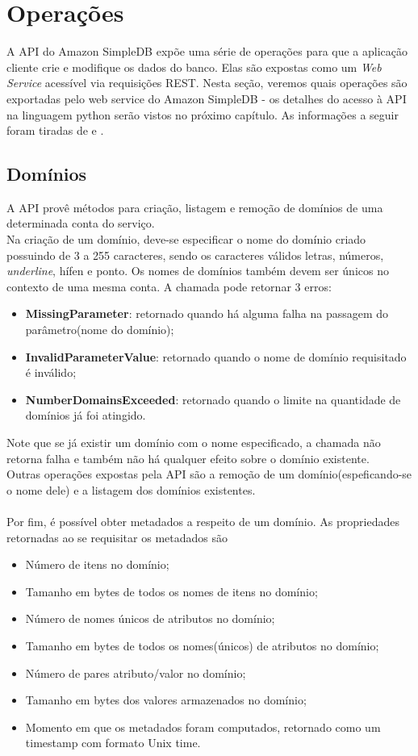 \section{Operações}
A API do Amazon SimpleDB expõe uma série de operações para que a aplicação cliente crie e modifique os dados do banco. Elas são expostas como um \textit{Web Service} acessível via requisições REST\cite{AmzSdbRef}. Nesta seção, veremos quais operações são exportadas pelo web service do Amazon SimpleDB - os detalhes do acesso à API na linguagem python serão vistos no próximo capítulo. As informações a seguir foram tiradas de \cite{habeeb2011} e \cite{AmzSdbRef}.

\subsection{Domínios}
A API provê métodos para criação, listagem e remoção de domínios de uma determinada conta do serviço.\\
Na criação de um domínio, deve-se especificar o nome do domínio criado possuindo de 3 a 255 caracteres, sendo os caracteres válidos letras, números, \textit{underline}, hífen e ponto. Os nomes de domínios também devem ser únicos no contexto de uma mesma conta. A chamada pode retornar 3 erros:
\\
\begin{itemize}
	\item \textbf{MissingParameter}: retornado quando há alguma falha na passagem do parâmetro(nome do domínio);
	\item \textbf{InvalidParameterValue}: retornado quando o nome de domínio requisitado é inválido;
	\item \textbf{NumberDomainsExceeded}: retornado quando o limite na quantidade de domínios já foi atingido.
\end{itemize}

Note que se já existir um domínio com o nome especificado, a chamada não retorna falha e também não há qualquer efeito sobre o domínio existente.\\
Outras operações expostas pela API são a remoção de um domínio(espeficando-se o nome dele) e a listagem dos domínios existentes.\\\\
Por fim, é possível obter metadados a respeito de um domínio. As propriedades retornadas ao se requisitar os metadados são
\\
\begin{itemize}
	\item Número de itens no domínio;
	\item Tamanho em bytes de todos os nomes de itens no domínio;
	\item Número de nomes únicos de atributos no domínio;
	\item Tamanho em bytes de todos os nomes(únicos) de atributos no domínio;
	\item Número de pares atributo/valor no domínio;
	\item Tamanho em bytes dos valores armazenados no domínio;
	\item Momento em que os metadados foram computados, retornado como um timestamp com formato Unix time.
\end{itemize}

